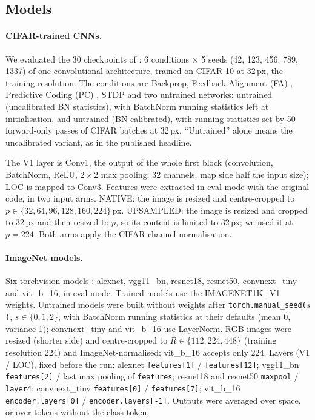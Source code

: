 \documentclass[10pt]{article}
\begin{document}
\subsection{Models}

\paragraph{CIFAR-trained CNNs.} We evaluated the 30 checkpoints of \citet{evalres}:
6 conditions $\times$ 5 seeds (42, 123, 456, 789, 1337) of one convolutional
architecture, trained on CIFAR-10 \citep{krizhevsky2009} at 32\,px, the training resolution. The
conditions are Backprop, Feedback Alignment (FA) \citep{lillicrap2016}, Predictive Coding (PC)
\citep{rao1999,whittington2017}, STDP \citep{bi1998,masquelier2007} and two untrained networks: untrained (uncalibrated BN
statistics), with BatchNorm running statistics left at initialisation, and untrained
(BN-calibrated), with running statistics set by 50 forward-only passes of CIFAR batches
at 32\,px. ``Untrained'' alone means the uncalibrated variant, as in the published
headline.

The V1 layer is Conv1, the output of the whole first block (convolution, BatchNorm, ReLU,
$2 \times 2$ max pooling; 32 channels, map side half the input size); LOC is mapped to
Conv3. Features were extracted in eval mode with the original code, in two
input arms. NATIVE: the image is resized and centre-cropped
to $p \in \{32, 64, 96, 128, 160, 224\}$\,px. UPSAMPLED: the image is resized and
cropped to 32\,px and then resized to $p$, so its content is limited to 32\,px; we used
it at $p = 224$. Both arms apply the CIFAR channel normalisation.

\paragraph{ImageNet models.} Six torchvision models \citep{paszke2019, marcel2010}: alexnet,
vgg11\_bn, resnet18, resnet50, convnext\_tiny and vit\_b\_16, in eval mode. Trained
models use the IMAGENET1K\_V1 weights. Untrained models were built without weights after
\texttt{torch.manual\_seed($s$)}, $s \in \{0, 1, 2\}$, with BatchNorm running statistics
at their defaults (mean 0, variance 1); convnext\_tiny and vit\_b\_16 use LayerNorm. RGB images
were resized (shorter side) and centre-cropped to $R \in \{112, 224, 448\}$ (training
resolution 224) and ImageNet-normalised; vit\_b\_16 accepts only 224. Layers (V1 / LOC),
fixed before the run: alexnet
\texttt{features[1]} / \texttt{features[12]}; vgg11\_bn \texttt{features[2]} / last max
pooling of \texttt{features}; resnet18 and resnet50 \texttt{maxpool} / \texttt{layer4};
convnext\_tiny \texttt{features[0]} / \texttt{features[7]}; vit\_b\_16
\texttt{encoder.layers[0]} / \texttt{encoder.layers[-1]}. Outputs were averaged over
space, or over tokens without the class token.
\end{document}
